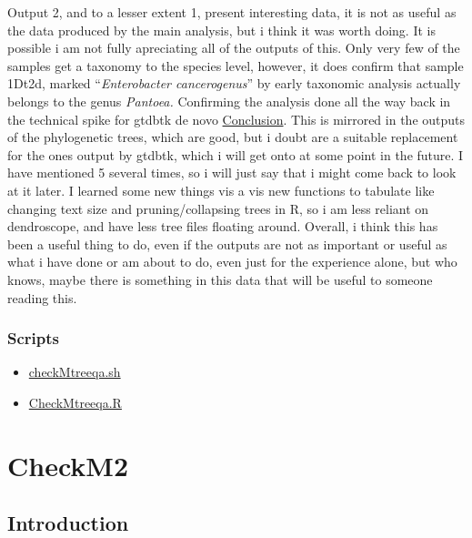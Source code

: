 \documentclass[
  letterpaper,
  DIV=11,
  numbers=noendperiod]{scrreprt}
\begin{document}
Output 2, and to a lesser extent 1, present interesting data, it is not
as useful as the data produced by the main analysis, but i think it was
worth doing. It is possible i am not fully apreciating all of the
outputs of this. Only very few of the samples get a taxonomy to the
species level, however, it does confirm that sample 1Dt2d, marked
``\emph{Enterobacter cancerogenus}'' by early taxonomic analysis
actually belongs to the genus \emph{Pantoea.} Confirming the analysis
done all the way back in the technical spike for gtdbtk de novo
\hyperref[conclusion]{Conclusion}. This is mirrored in the outputs of
the phylogenetic trees, which are good, but i doubt are a suitable
replacement for the ones output by gtdbtk, which i will get onto at some
point in the future. I have mentioned 5 several times, so i will just
say that i might come back to look at it later. I learned some new
things vis a vis new functions to tabulate like changing text size and
pruning/collapsing trees in R, so i am less reliant on dendroscope, and
have less tree files floating around. Overall, i think this has been a
useful thing to do, even if the outputs are not as important or useful
as what i have done or am about to do, even just for the experience
alone, but who knows, maybe there is something in this data that will be
useful to someone reading this.

\subsection{Scripts}\label{scripts-1}

\begin{itemize}
\item
  \href{https://github.com/tobiasnunn/tnunn_research/blob/3d90f340592d7081d3c6e172cbc786c8b85f368f/00_scripts/checkMtreeqa.sh}{checkMtreeqa.sh}
\item
  \href{https://github.com/tobiasnunn/tnunn_research/blob/20d1f52225ae83ba449e471cd260ce62f92c4ed9/00_scripts/CheckMtreeqa.R}{CheckMtreeqa.R}
\end{itemize}


\chapter{CheckM2}\label{checkm2}

\section{Introduction}\label{introduction-5}
\end{document}
